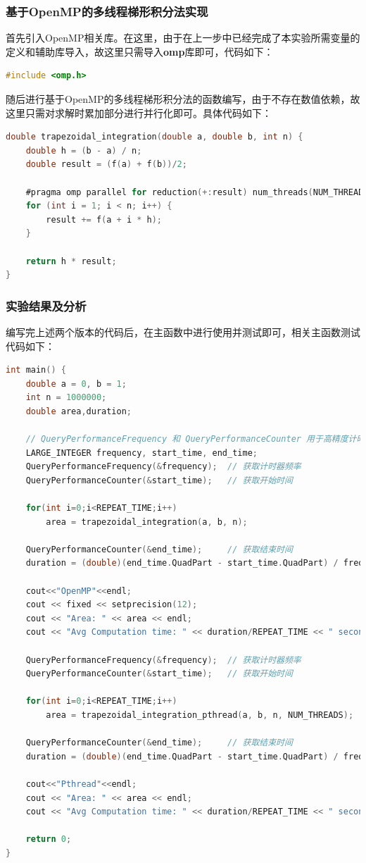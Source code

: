 \documentclass{nku}
\begin{document}
\subsubsection{基于OpenMP的多线程梯形积分法实现}
首先引入OpenMP相关库。在这里，由于在上一步中已经完成了本实验所需变量的定义和辅助库导入，故这里只需导入\textbf{omp}库即可，代码如下：
\begin{lstlisting}[language=C]
#include <omp.h>
\end{lstlisting}

随后进行基于OpenMP的多线程梯形积分法的函数编写，由于不存在数值依赖，故这里只需对求解时累加部分进行并行化即可。具体代码如下：
\begin{lstlisting}[language=C]
double trapezoidal_integration(double a, double b, int n) {
    double h = (b - a) / n;
    double result = (f(a) + f(b))/2;

    #pragma omp parallel for reduction(+:result) num_threads(NUM_THREADS)
    for (int i = 1; i < n; i++) {
        result += f(a + i * h);
    }

    return h * result;
}
\end{lstlisting}

\subsubsection{实验结果及分析}
编写完上述两个版本的代码后，在主函数中进行使用并测试即可，相关主函数测试代码如下：
\begin{lstlisting}[language=C]
int main() {
    double a = 0, b = 1;
    int n = 1000000;
    double area,duration;

    // QueryPerformanceFrequency 和 QueryPerformanceCounter 用于高精度计时
    LARGE_INTEGER frequency, start_time, end_time;
    QueryPerformanceFrequency(&frequency);  // 获取计时器频率
    QueryPerformanceCounter(&start_time);   // 获取开始时间

    for(int i=0;i<REPEAT_TIME;i++)
        area = trapezoidal_integration(a, b, n);

    QueryPerformanceCounter(&end_time);     // 获取结束时间
    duration = (double)(end_time.QuadPart - start_time.QuadPart) / frequency.QuadPart;

    cout<<"OpenMP"<<endl;
    cout << fixed << setprecision(12);
    cout << "Area: " << area << endl;
    cout << "Avg Computation time: " << duration/REPEAT_TIME << " seconds" << endl;

    QueryPerformanceFrequency(&frequency);  // 获取计时器频率
    QueryPerformanceCounter(&start_time);   // 获取开始时间

    for(int i=0;i<REPEAT_TIME;i++)
        area = trapezoidal_integration_pthread(a, b, n, NUM_THREADS);

    QueryPerformanceCounter(&end_time);     // 获取结束时间
    duration = (double)(end_time.QuadPart - start_time.QuadPart) / frequency.QuadPart;

    cout<<"Pthread"<<endl;
    cout << "Area: " << area << endl;
    cout << "Avg Computation time: " << duration/REPEAT_TIME << " seconds" << endl;

    return 0;
}
\end{lstlisting}
\end{document}
